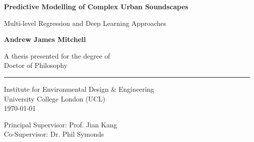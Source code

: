 \documentclass[twoside,fontsize=12pt,titlepage]{scrbook}
\begin{document}
\begin{titlepage}
      \AddToShipoutPicture*{}
      \begin{center}
            \vspace*{3cm}

            \Huge
            \textbf{Predictive Modelling of Complex Urban Soundscapes}

            \vspace{0.5cm}
            \LARGE
            Multi-level Regression and Deep Learning Approaches

            \vspace{1.5cm}

            \textbf{Andrew James Mitchell}

            \vfill
            A thesis presented for the degree of\\
            Doctor of Philosophy\\
            \rule[-.5cm]{0.5\textwidth}{1pt}

            \vspace{1.5cm}

            \Large
            Institute for Environmental Design \& Engineering\\
            University College London (UCL)\\
            \today

            \vspace{1cm}

            Principal Supervisor: Prof. Jian Kang\\
            Co-Supervisor: Dr. Phil Symonds

      \end{center}
\end{titlepage}


\restoregeometry


\end{document}
